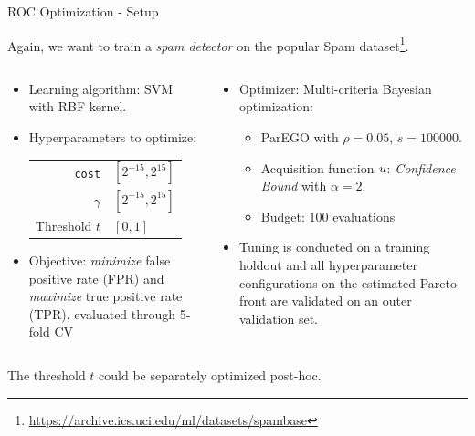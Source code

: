 \begin{frame}{ROC Optimization - Setup}

  Again, we want to train a \textit{spam detector} on the popular Spam dataset\footnote{\url{https://archive.ics.uci.edu/ml/datasets/spambase}}.

\begin{columns}
\begin{column}{0.5\textwidth}
\begin{itemize}
        \item Learning algorithm: SVM with RBF kernel.
        \item Hyperparameters to optimize: \\
        \begin{tabular}{rl}
        \texttt{cost} & $[2^{-15}, 2^{15}]$ \\
        $\gamma$ & $[2^{-15}, 2^{15}]$ \\
        Threshold $t$ & $[0,1]$ \\
        \end{tabular}
        \item Objective: \emph{minimize} false positive rate (FPR) and \emph{maximize} true positive rate (TPR), evaluated through 5-fold CV
\end{itemize}
\end{column}%
\begin{column}{0.5\textwidth}
\begin{itemize}
        \item Optimizer: Multi-criteria Bayesian optimization:
            \begin{itemize}
              \item ParEGO with $\rho = 0.05$, $s = 100000$.
              \item Acquisition function $u$: \emph{Confidence Bound} with $\alpha = 2$.
              \item Budget: $100$ evaluations
            \end{itemize}
        \item Tuning is conducted on a training holdout and all hyperparameter configurations on the estimated Pareto front are validated on an outer validation set.
\end{itemize}
\end{column}
\end{columns}
\vspace{0.5cm}
    {\footnotesize The threshold $t$ could be separately optimized post-hoc.}
\end{frame}

